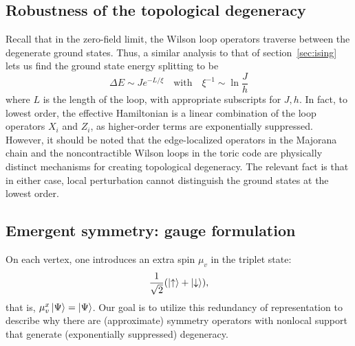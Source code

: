 \documentclass{article}
\begin{document}
\subsection{Robustness of the topological degeneracy}
Recall that in the zero-field limit, the Wilson loop operators traverse between the degenerate ground states.
Thus, a similar analysis to that of section~\ref{sec:ising} lets us find
the ground state energy splitting to be
\[
    \Delta E \sim J e^{-L/\xi}\quad \text{with}\quad
    \xi^{-1} \sim \ln \frac{J}{h}
\]
where $L$ is the length of the loop, with appropriate subscripts for $J, h$.
In fact, to lowest order, the effective Hamiltonian is a linear combination of the
loop operators $X_i$ and $Z_i$,
as higher-order terms are exponentially suppressed.
However, it should be noted that the edge-localized operators in the Majorana chain
and the noncontractible Wilson loops in the toric code
are physically distinct mechanisms for creating topological degeneracy.
The relevant fact is that in either case, local perturbation cannot distinguish
the ground states at the lowest order.

\subsection{Emergent symmetry: gauge formulation}
On each vertex, one introduces an extra spin $\mu_v$ in the triplet state:
\[
    \frac{1}{\sqrt{2}}(\ket{\uparrow} + \ket{\downarrow}),
\]
that is, $\mu_v^x \ket{\Psi} = \ket{\Psi}$.
Our goal is to utilize this redundancy of representation
to describe why there are (approximate) symmetry operators with nonlocal support
that generate (exponentially suppressed) degeneracy.
\end{document}
